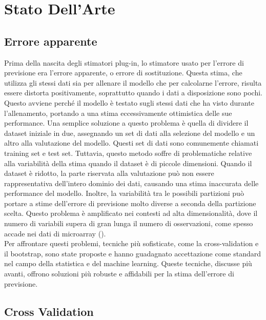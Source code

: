 \chapter{Stato Dell'Arte}
\label{ch:capitolo7}


\section{Errore apparente}
\label{sec:sezione7.1}


Prima della nascita degli stimatori plug-in, lo stimatore usato per l’errore di previsione era l’errore apparente, o errore di sostituzione. Questa stima, che utilizza gli stessi dati sia per allenare il modello che per calcolarne l’errore, risulta essere distorta positivamente, soprattutto quando i dati a disposizione sono pochi. Questo avviene perché il modello è testato sugli stessi dati che ha visto durante l'allenamento, portando a una stima eccessivamente ottimistica delle sue performance. Una semplice soluzione a questo problema è quella di dividere il dataset iniziale in due, assegnando un set di dati alla selezione del modello e un altro alla valutazione del modello. Questi set di dati sono comunemente chiamati training set e test set. Tuttavia, questo metodo soffre di problematiche relative alla variabilità della stima quando il dataset è di piccole dimensioni. Quando il dataset è ridotto, la parte riservata alla valutazione può non essere rappresentativa dell'intero dominio dei dati, causando una stima inaccurata delle performance del modello. Inoltre, la variabilità tra le possibili partizioni può portare a stime dell'errore di previsione molto diverse a seconda della partizione scelta. Questo problema è amplificato nei contesti ad alta dimensionalità, dove il numero di variabili supera di gran lunga il numero di osservazioni, come spesso accade nei dati di microarray (\textcite{mclachlan}).\\
Per affrontare questi problemi, tecniche più sofisticate, come la cross-validation e il bootstrap, sono state proposte e hanno guadagnato accettazione come standard nel campo della statistica e del machine learning. Queste tecniche, discusse più avanti, offrono soluzioni più robuste e affidabili per la stima dell'errore di previsione.


\section{Cross Validation}
\label{sec:sezione7.2}



